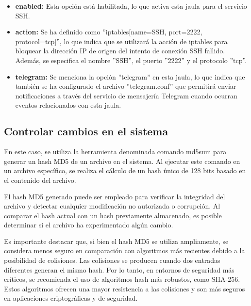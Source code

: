 				\begin{itemize}
					\item \textbf{enabled:} Esta opción está habilitada, lo que activa esta jaula para el servicio SSH.
				
					\item \textbf{action:} Se ha definido como ''iptables[name=SSH, port=2222, protocol=tcp]'', lo que indica que se utilizará la acción de iptables para bloquear la dirección IP de origen del intento de conexión SSH fallido. Además, se especifica el nombre ''SSH'', el puerto ''2222'' y el protocolo ''tcp''.
				
					\item \textbf{telegram:} Se menciona la opción ''telegram'' en esta jaula, lo que indica que también se ha configurado el archivo ''telegram.conf'' que permitirá enviar notificaciones a través del servicio de mensajería Telegram cuando ocurran eventos relacionados con esta jaula.
			
			
			\end{itemize}
			

		
			\subsection{Controlar cambios en el sistema}
			
			En este caso, se utiliza la herramienta denominada comando md5sum para generar un hash MD5 de un archivo en el sistema. Al ejecutar este comando en un archivo específico, se realiza el cálculo de un hash único de 128 bits basado en el contenido del archivo.\par
			
			El hash MD5 generado puede ser empleado para verificar la integridad del archivo y detectar cualquier modificación no autorizada o corrupción. Al comparar el hash actual con un hash previamente almacenado, es posible determinar si el archivo ha experimentado algún cambio.\par
			
			Es importante destacar que, si bien el hash MD5 se utiliza ampliamente, se considera menos seguro en comparación con algoritmos más recientes debido a la posibilidad de colisiones. Las colisiones se producen cuando dos entradas diferentes generan el mismo hash. Por lo tanto, en entornos de seguridad más críticos, se recomienda el uso de algoritmos hash más robustos, como SHA-256. Estos algoritmos ofrecen una mayor resistencia a las colisiones y son más seguros en aplicaciones criptográficas y de seguridad.\par
			

